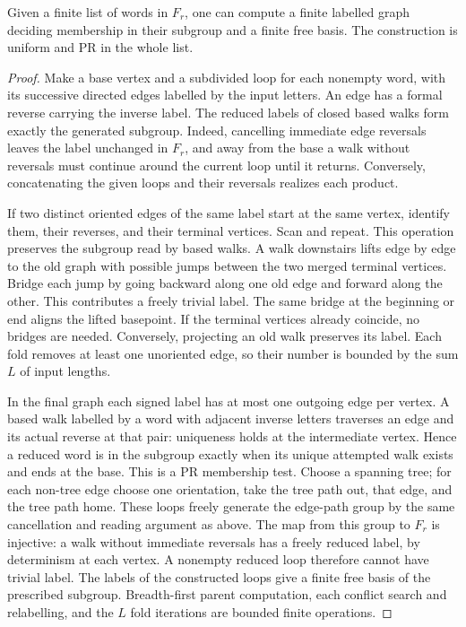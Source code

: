 \begin{theorem}\label{thm:fold}\label{idx-schreier29}
Given a finite list of words in $F_r$, one can compute a finite labelled graph deciding membership in their subgroup and a finite free basis. The construction is uniform and PR in the whole list.
\end{theorem}
\begin{proof}
Make a base vertex and a subdivided loop for each nonempty word, with its successive directed edges labelled by the input letters. An edge has a formal reverse carrying the inverse label. The reduced labels of closed based walks form exactly the generated subgroup. Indeed, cancelling immediate edge reversals leaves the label unchanged in $F_r$, and away from the base a walk without reversals must continue around the current loop until it returns. Conversely, concatenating the given loops and their reversals realizes each product.

If two distinct oriented edges of the same label start at the same vertex, identify them, their reverses, and their terminal vertices. Scan and repeat. This operation preserves the subgroup read by based walks. A walk downstairs lifts edge by edge to the old graph with possible jumps between the two merged terminal vertices. Bridge each jump by going backward along one old edge and forward along the other. This contributes a freely trivial label. The same bridge at the beginning or end aligns the lifted basepoint. If the terminal vertices already coincide, no bridges are needed. Conversely, projecting an old walk preserves its label. Each fold removes at least one unoriented edge, so their number is bounded by the sum $L$ of input lengths.

In the final graph each signed label has at most one outgoing edge per vertex. A based walk labelled by a word with adjacent inverse letters traverses an edge and its actual reverse at that pair: uniqueness holds at the intermediate vertex. Hence a reduced word is in the subgroup exactly when its unique attempted walk exists and ends at the base. This is a PR membership test. Choose a spanning tree; for each non-tree edge choose one orientation, take the tree path out, that edge, and the tree path home. These loops freely generate the edge-path group by the same cancellation and reading argument as above. The map from this group to $F_r$ is injective: a walk without immediate reversals has a freely reduced label, by determinism at each vertex. A nonempty reduced loop therefore cannot have trivial label. The labels of the constructed loops give a finite free basis of the prescribed subgroup. Breadth-first parent computation, each conflict search and relabelling, and the $L$ fold iterations are bounded finite operations.
\end{proof}
